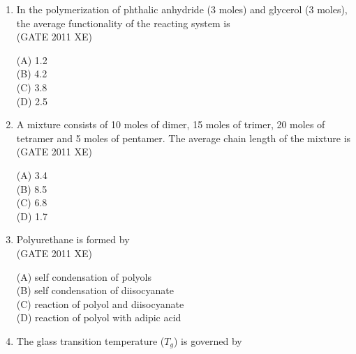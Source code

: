 \documentclass[journal,12pt,onecolumn]{IEEEtran}
\begin{document}
\begin{enumerate}
\begin{enumerate}
\begin{enumerate}[label=\arabic*)]
\hfill{(GATE 2011 XE)} \\
\begin{multicols}{2}
(A) one hydroxyl and one carboxylic group\\
(B) double bonds\\
(C) one amine group and one carboxylic group\\
(D) two amine groups
\end{multicols}

\item In the polymerization of phthalic anhydride (3 moles) and glycerol (3 moles), the average functionality of the reacting system is\\

\hfill{(GATE 2011 XE)} \\
\begin{multicols}{4}
(A) 1.2\\
(B) 4.2\\
(C) 3.8\\
(D) 2.5
\end{multicols}

\item A mixture consists of 10 moles of dimer, 15 moles of trimer, 20 moles of tetramer and 5 moles of pentamer. The average chain length of the mixture is\\

\hfill{(GATE 2011 XE)} \\
\begin{multicols}{4}
(A) 3.4\\
(B) 8.5\\
(C) 6.8\\
(D) 1.7
\end{multicols}


\item Polyurethane is formed by\\

\hfill{(GATE 2011 XE)} \\
\begin{multicols}{2}
(A) self condensation of polyols\\
(B) self condensation of diisocyanate\\
(C) reaction of polyol and diisocyanate\\
(D) reaction of polyol with adipic acid
\end{multicols}


\item The glass transition temperature ($T_g$) is governed by\\


\end{enumerate}
\end{enumerate}
\end{enumerate}
\end{document}
